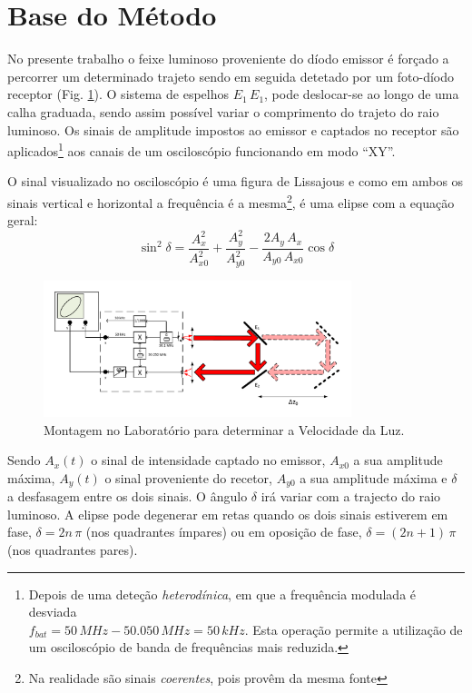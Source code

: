\documentclass[a4paper,12pt]{article}      %
\begin{document}

\section{\sf Base do Método}
No presente trabalho o feixe luminoso proveniente do díodo emissor
é forçado a percorrer um determinado trajeto sendo em seguida detetado
por um foto-díodo receptor (Fig. \ref{fig:Montagem}). O sistema de espelhos $E_1\,E_1$, pode deslocar-se ao longo de uma calha graduada,
sendo assim possível variar o comprimento do trajeto do raio luminoso. Os
sinais de amplitude impostos ao emissor e captados no receptor são aplicados\footnote{Depois de uma deteção \emph{heterodínica}, em que a frequência modulada é desviada \\ 
$f_{bat}=50\, MHz -50.050\, MHz = 50\,kHz$. Esta operação permite a utilização de um osciloscópio de banda de frequências mais reduzida.} 
aos canais de um osciloscópio funcionando em modo “XY”.

O sinal visualizado no osciloscópio é uma figura de Lissajous e como em ambos os sinais vertical e horizontal a frequência é a 
mesma\footnote{Na realidade são sinais \emph{coerentes}, pois provêm da mesma fonte}, é uma elipse com a equação geral:
\begin{equation}
	\label{eq:elipse}
	\sin^2 \delta = \frac{A_x^2}{A_{x0}^2} + \frac{A_y^2}{A_{y0}^2} - \frac{2 A_y\,A_x}{A_{y0}\,A_{x0}} \cos  \delta
\end{equation}

\begin{figure}
	[htb]  \centering 
	\includegraphics[width=0.8\textwidth]{Vel_esquema}
	\caption{Montagem no Laboratório para determinar a Velocidade da Luz. \label{fig:Montagem}} 
\end{figure}

Sendo $A_x(t)$ o sinal de intensidade captado no emissor,  $A_{x0}$ a sua amplitude máxima,  $A_y(t)$ o sinal
proveniente do recetor, $A_{y0}$ a sua amplitude máxima e $\delta$ a desfasagem entre os dois
sinais. O ângulo $\delta$ irá variar com a trajecto do raio luminoso.  A elipse pode degenerar em retas quando os dois sinais estiverem
em fase, $\delta = 2n\,\pi$ (nos quadrantes ímpares)  ou em oposição de fase, $\delta = (2n+1)\,\pi$ (nos quadrantes pares). 
\end{document}
